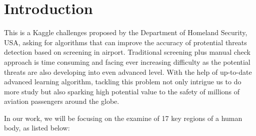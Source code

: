 \documentclass[conference,compsoc]{IEEEtran}
\begin{document}
\section{Introduction}
	\par
	This is a Kaggle challenges proposed by the Department of Homeland Security, USA, asking for algorithms that can improve the accuracy of protential threats detection based on screening in airport. Traditional screening plus manual check approach is time consuming and facing ever increasing difficulty as the potential threats are also developing into even advanced level. With the help of up-to-date advanced learning algorithm, tackling this problem not only intrigue us to do more study but also sparking high potential value to the safety of millions of aviation passengers around the globe.
	\par
	In our work, we will be focusing on the examine of 17 key regions of a human body, as listed below:
\end{document}
